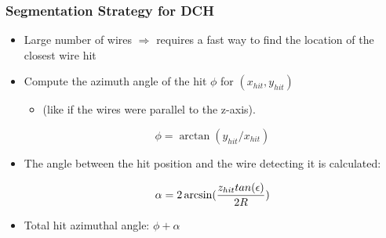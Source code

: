 \documentclass[aspectratio=169, hyperref={colorlinks=true,pdfpagelabels=false,linkcolor=black}, xcolor=dvipsnames,10pt]{beamer}
\begin{document}
\begin{frame}
  \frametitle{Segmentation Strategy for DCH}


    \begin{itemize}
    \item Large number of wires $\Rightarrow$ requires a fast way to find the
      location of the closest wire hit
    \item Compute the azimuth angle of the hit $\phi$ for $(x_{hit},
      y_{hit})$ 
      \begin{itemize}
      \item (like if the wires were parallel to the z-axis).
      \end{itemize}

    \begin{equation}
      \phi = \arctan(y_{hit}/x_{hit})
    \end{equation}

    \item The angle between the hit position and the wire detecting it
      is calculated:

    \begin{equation}
      \alpha = 2 \arcsin({{z_{hit} tan(\epsilon)} \over {2R}})
    \end{equation}
  \item Total hit azimuthal angle: $\phi+\alpha$
    \end{itemize}


    \begin{columns}


\end{columns}
\end{frame}
\end{document}
